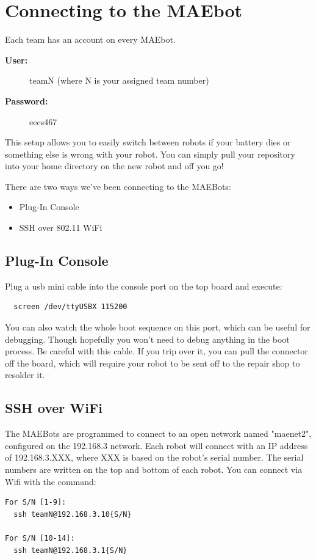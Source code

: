\documentclass{article}
\begin{document}
\section*{Connecting to the MAEbot}

Each team has an account on every MAEbot.

\begin{description}
  \item[\textbf{User:}]     teamN   (where N is your assigned team number)
  \item[\textbf{Password:}] eecs467
\end{description}
  

This setup allows you to easily switch between robots if your battery dies or something else is wrong with your robot. You can simply pull your repository into your home directory 
on the new robot and off you go!

There are two ways we've been connecting to the MAEBots:

\begin{itemize}
 \item Plug-In Console
 \item SSH over 802.11 WiFi
\end{itemize}

\subsection*{Plug-In Console}
Plug a usb mini cable into the console port on the top board and execute:

\begin{verbatim}
  screen /dev/ttyUSBX 115200
\end{verbatim}

You can also watch the whole boot sequence on this port, which can be useful for debugging. Though hopefully you won't need to debug anything in the boot process.
Be careful with this cable. If you trip over it, you can pull the connector off the board, which will require your robot to be sent off to the repair shop to resolder it.

\subsection*{SSH over WiFi}
The MAEBots are programmed to connect to an open network named "maenet2", configured on the 192.168.3 network. Each robot will connect with an IP address of 192.168.3.XXX, where XXX is based on the robot's serial number. The 
serial numbers are written on the top and bottom of each robot. You can connect via Wifi with the command:

\begin{verbatim}
For S/N [1-9]:
  ssh teamN@192.168.3.10{S/N}

For S/N [10-14]:
  ssh teamN@192.168.3.1{S/N}

\end{verbatim}
\end{document}
